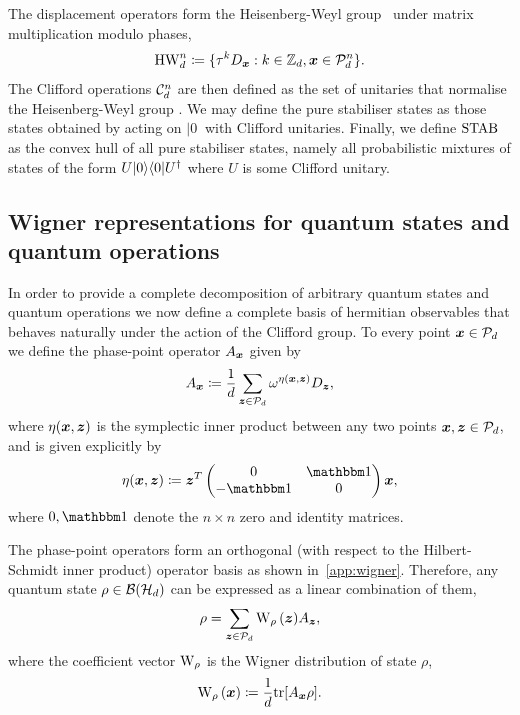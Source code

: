 \documentclass[pra,
aps,
twocolumn,
superscriptaddress,
groupedaddress,
nofootinbib,
reprint
]{revtex4-1}
\begin{document}
The displacement operators form the Heisenberg-Weyl group~\cite{Folland_1989, Bengtsson_2006} under matrix multiplication modulo phases,
\begin{equation}\label{eq:gp}
    {\rm{HW}}_d^n \coloneqq \{ \tau^k D_{\bmx}: k \in \mathbb{Z}_d, \bmx \in \cal{P}_d^n\}.
\end{equation}
The Clifford operations $ \cal{C}_d^n $ are then defined as the set of unitaries that normalise the Heisenberg-Weyl group \ddd{[CITE]}. We may define the pure stabiliser states as those states obtained by acting on $|0\>$ with Clifford unitaries. Finally, we define $\stab$ as the convex hull of all pure stabiliser states, namely all probabilistic mixtures of states of the form $U|0\>\<0|U^\dagger$ where $U$ is some Clifford unitary. 

\subsection{Wigner representations for quantum states and quantum operations}\label{sec:wigner}

In order to provide a complete decomposition of arbitrary quantum states and quantum operations we now define a complete basis of hermitian observables that behaves naturally under the action of the Clifford group. To every point $\x \in \P_d$ we define the phase-point operator $A_{\x}$ given by
\begin{align}
	A_{\bmx} \coloneqq \frac{1}{d} \sum_{\bmz \in \cal{P}_d} \omega^{\eta(\bmx, \bmz)} D_{\bmz}, \label{eq:ax}
\end{align}
where $\eta(\bmx, \bmz)$ is the symplectic inner product between any two points $\x,\z \in \P_d$, and is given explicitly by
\begin{equation}
	\eta(\bmx, \bmz) \coloneqq \bmz^T \begin{pmatrix}
		0  & \id \\ %
		-\id & 0 \\ %
	\end{pmatrix} \bmx,
\end{equation}
where $0, \id$ denote the $n\times n$ zero and identity matrices.

The phase-point operators form an orthogonal (with respect to the Hilbert-Schmidt inner product) operator basis as shown in~\cref{app:wigner}.
Therefore, any quantum state $\rho \in \cal{B}(\cal{H}_d)$ can be expressed as a linear combination of them,
\begin{equation}
    \rho = \sum_{\bmz \in \cal{P}_d} \W[\bmz]{\rho} A_{\bmz},
\end{equation}
where the coefficient vector $\W{\rho}$ is the Wigner distribution of state $\rho$,
\begin{equation}\label{eq:wstate}
    \W[\bmx]{\rho} \coloneqq \frac{1}{d}\tr[A_{\bmx} \rho].
\end{equation}
\end{document}
